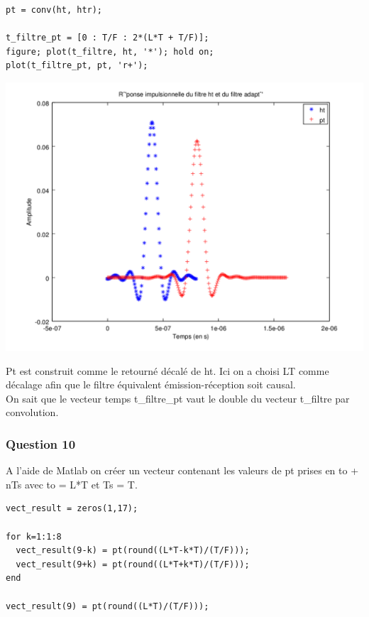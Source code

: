 \documentclass{acm_proc_article-sp}
\begin{document}
\begin{center}
\begin{center}
\begin{center}
\begin{lstlisting}
pt = conv(ht, htr);

t_filtre_pt = [0 : T/F : 2*(L*T + T/F)];
figure; plot(t_filtre, ht, '*'); hold on;
plot(t_filtre_pt, pt, 'r+');
\end{lstlisting}

\includegraphics[scale=0.45]{ht_pt_9.png}
\end{center}

Pt est construit comme le retourné décalé de ht. Ici on a choisi LT comme décalage afin que le filtre équivalent émission-réception soit causal.\\
On sait que le vecteur temps t\_filtre\_pt vaut le double du vecteur t\_filtre par convolution.

\subsubsection{Question 10}


A l'aide de Matlab on créer un vecteur contenant les valeurs de pt prises en to + nTs avec to = L*T et Ts = T.

\begin{center}
\begin{lstlisting}
vect_result = zeros(1,17);

for k=1:1:8
  vect_result(9-k) = pt(round((L*T-k*T)/(T/F)));
  vect_result(9+k) = pt(round((L*T+k*T)/(T/F)));
end

vect_result(9) = pt(round((L*T)/(T/F)));


\end{lstlisting}
\end{center}
\end{center}
\end{center}
\end{document}
